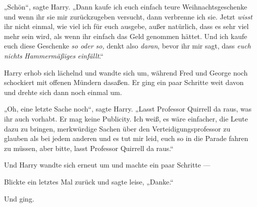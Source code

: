 „Schön“, sagte Harry.
„Dann kaufe ich euch einfach teure Weihnachtsgeschenke und wenn ihr sie mir zurückzugeben versucht, dann verbrenne ich sie. Jetzt \emph{wisst} ihr nicht einmal, wie viel ich für euch ausgebe, außer natürlich, dass es sehr viel mehr sein wird, als wenn ihr einfach das Geld genommen hättet. Und ich kaufe euch diese Geschenke \emph{so oder so,} denkt also \emph{daran}, bevor ihr mir sagt, dass \emph{euch nichts} \emph{Hammermäßiges} \emph{einfällt}.“%

Harry erhob sich lächelnd und wandte sich um, während Fred und George noch schockiert mit offenen Mündern dasaßen. Er ging ein paar Schritte weit davon und drehte sich dann noch einmal um.

„Oh, eine letzte Sache noch“, sagte Harry.
„Lasst Professor Quirrell da raus, was ihr auch vorhabt. Er mag keine Publicity. Ich weiß, es wäre einfacher, die Leute dazu zu bringen, merkwürdige Sachen über den Verteidigungsprofessor zu glauben als bei jedem anderen und es tut mir leid, euch so in die Parade fahren zu müssen, aber bitte, lasst Professor Quirrell da raus.“

Und Harry wandte sich erneut um und machte ein paar Schritte —

Blickte ein letztes Mal zurück und sagte leise,
„Danke.“

Und ging.

